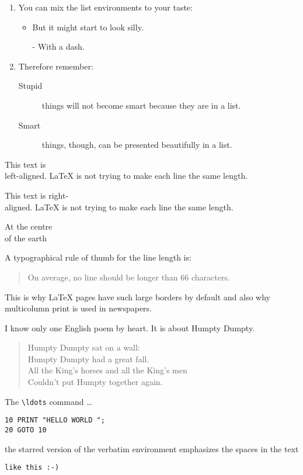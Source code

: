 \documentclass[a4paper,11pt,twocolumn]{article}
\begin{document}
\flushleft

\begin{enumerate}
\item You can mix the list
environments to your taste:
\begin{itemize}
\item But it might start to
look silly.
\item[-] With a dash.
\end{itemize}

\item Therefore remember:
\begin{description}
\item[Stupid] things will not
become smart because they are
in a list.
\item[Smart] things, though, can be
presented beautifully in a list.
\end{description}
\end{enumerate}


\begin{flushleft}
This text is\\ left-aligned.
\LaTeX{} is not trying to make
each line the same length.
\end{flushleft}

\begin{flushright}
This text is right-\\aligned.
\LaTeX{} is not trying to make
each line the same length.
\end{flushright}

\begin{center}
At the centre\\of the earth
\end{center}

A typographical rule of thumb
for the line length is:
\begin{quote}
On average, no line should
be longer than 66 characters.
\end{quote}
This is why \LaTeX{} pages have
such large borders by default and
also why multicolumn print is
used in newspapers.

I know only one English poem by
heart. It is about Humpty Dumpty.
\begin{flushleft}
\begin{verse}
Humpty Dumpty sat on a wall:\\
Humpty Dumpty had a great fall.\\
All the King’s horses and all
the King’s men\\
Couldn’t put Humpty together
again.
\end{verse}
\end{flushleft}


The \verb|\ldots| command \ldots
\begin{verbatim}
10 PRINT "HELLO WORLD ";
20 GOTO 10
\end{verbatim}


\begin{verbatim*}
the starred version of
the verbatim
environment emphasizes
the spaces in the text
\end{verbatim*}

\verb*|like this :-) | 
\end{document}
